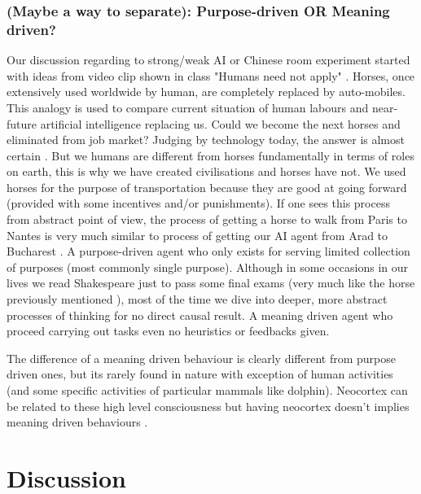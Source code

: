 \documentclass[11pt]{article}
\newenvironment{draft}{\color{dark-cornflower-blue-2}}{\ignorespacesafterend}
\begin{document}

\subsubsection*{(Maybe a way to separate): Purpose-driven OR Meaning driven?}
 
 \begin{draft}
Our discussion regarding to strong/weak AI or Chinese room experiment started with ideas from video clip shown in class "Humans need not apply" \cite{grey2014humans}. Horses, once extensively used worldwide by human, are completely replaced by auto-mobiles. This analogy is used to compare current situation of human labours and near-future artificial intelligence replacing us. Could we become the next horses and eliminated from job market? Judging by technology today, the answer is almost certain . But we humans are different from horses fundamentally in terms of roles on earth, this is why we have created civilisations and horses have not. We used horses for the purpose of transportation because they are good at going forward (provided with some incentives and/or punishments). If one sees this process from abstract point of view, the process of getting a horse to walk from Paris to Nantes is very much similar to process of getting our AI agent from Arad to Bucharest . A purpose-driven agent who only exists for serving limited collection of purposes (most commonly single purpose). Although in some occasions in our lives we read Shakespeare just to pass some final exams (very much like the horse previously mentioned ), most of the time we dive into deeper, more abstract processes of thinking for no direct causal result. A meaning driven agent who proceed carrying out tasks even no heuristics or feedbacks given. 

The difference of a meaning driven behaviour is clearly different from purpose driven ones, but its rarely found in nature with exception of human activities (and some specific activities of particular mammals like dolphin). Neocortex can be related to these high level consciousness but having neocortex doesn't implies meaning driven behaviours . 
\end{draft}

\section{Discussion}
\label{sec:discussion}
\end{document}
